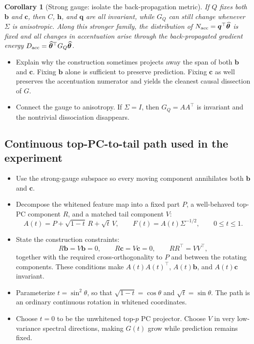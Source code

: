 \documentclass[11pt]{article}
\newtheorem{corollary}[theorem]{Corollary}
\newcommand{\that}{\widehat{\bm\theta}}
\begin{document}
\begin{corollary}[Strong gauge: isolate the back-propagation metric]
\label{cor:strong-gauge}
If $Q$ fixes both $\bm b$ and $\bm c$, then $C$, $\bm h$, and $\bm q$ are
all invariant, while $G_Q$ can still change whenever $\Sigma$ is anisotropic.
Along this stronger family, the distribution of
$N_{\rm acc}=\bm q^{\top}\that$ is fixed and all changes in accentuation arise
through the back-propagated gradient energy
$D_{\rm acc}=\that^{\top}G_Q\that$.
\end{corollary}

\begin{itemize}
  \item Explain why the construction sometimes projects away the span of
        both $\bm b$ and $\bm c$. Fixing $\bm b$ alone is sufficient to
        preserve prediction. Fixing $\bm c$ as well preserves the
        accentuation numerator and yields the cleanest causal dissection of
        $G$.
  \item Connect the gauge to anisotropy. If $\Sigma=I$, then
        $G_Q=AA^{\top}$ is invariant and the nontrivial dissociation
        disappears.
\end{itemize}

\subsection{Continuous top-PC-to-tail path used in the experiment}

\begin{itemize}
  \item Use the strong-gauge subspace so every moving component annihilates
        both $\bm b$ and $\bm c$.
  \item Decompose the whitened feature map into a fixed part $P$, a
        well-behaved top-PC component $R$, and a matched tail component $V$:
  \begin{equation}
    A(t)=P+\sqrt{1-t}\,R+\sqrt t\,V,
    \qquad
    F(t)=A(t)\Sigma^{-1/2},
    \qquad 0\le t\le1.
    \label{eq:continuous-path}
  \end{equation}
  \item State the construction constraints:
  \begin{equation}
    R\bm b=V\bm b=0,
    \qquad
    R\bm c=V\bm c=0,
    \qquad
    RR^{\top}=VV^{\top},
  \end{equation}
  together with the required cross-orthogonality to $P$ and between the
  rotating components. These conditions make $A(t)A(t)^{\top}$,
  $A(t)\bm b$, and $A(t)\bm c$ invariant.
  \item Parameterize $t=\sin^2\theta$, so that
        $\sqrt{1-t}=\cos\theta$ and $\sqrt t=\sin\theta$. The path is an
        ordinary continuous rotation in whitened coordinates.
  \item Choose $t=0$ to be the unwhitened top-$p$ PC projector. Choose $V$
        in very low-variance spectral directions, making $G(t)$ grow while
        prediction remains fixed.
\end{itemize}
\end{document}
